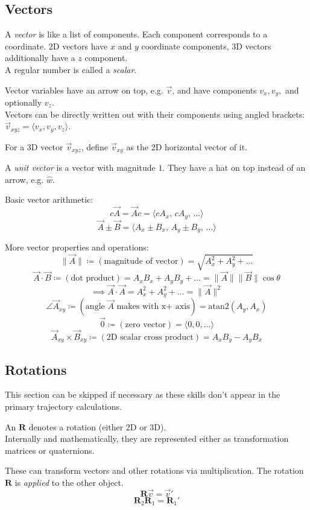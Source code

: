 \documentclass{article}
\begin{document}
\subsection*{Vectors}
A \textit{vector} is like a list of components. Each component corresponds to a coordinate. 2D vectors have $x$ and $y$ coordinate components, 3D vectors additionally have a $z$ component. \\
A regular number is called a \textit{scalar}.

Vector variables have an arrow on top, e.g. $\vec{v}$, and have components $v_x,v_y,$ and optionally $v_z$. \\
Vectors can be directly written out with their components using angled brackets: $\vec{v}_{xyz}=\langle v_x,v_y,v_z\rangle$.

For a 3D vector $\vec{v}_{xyz}$, define $\vec{v}_{xy}$ as the 2D horizontal vector of it.

A \textit{unit vector} is a vector with magnitude $1$. They have a hat on top instead of an arrow, e.g. $\hat{w}$.

Basic vector arithmetic:
\[ c\vec{A}=\vec{A}c=\langle cA_x,\,cA_y,\,\ldots\rangle \]
\[ \vec{A}\pm\vec{B}=\langle A_x\pm B_x,\,A_y\pm B_y,\,\ldots\rangle \]

More vector properties and operations:
\[ \lVert \vec{A} \rVert\coloneqq(\text{magnitude of vector})=\sqrt{A_x^2+A_y^2+\ldots} \]
\[ \vec{A}\cdot\vec{B}\coloneqq(\text{dot product})=A_xB_x+A_yB_y+\ldots=\lVert \vec{A} \rVert\lVert \vec{B} \rVert \cos\theta \]
\[ \implies \vec{A}\cdot\vec{A}=A_x^2+A_y^2+\ldots=\lVert \vec{A} \rVert^2 \]
\[ \angle\vec{A}_{xy}\coloneqq(\text{angle }\vec{A}\text{ makes with x+ axis})=\text{atan2}(A_y,A_x) \]
\[ \vec{0}\coloneqq(\text{zero vector})=\langle0,0,\ldots\rangle \]
\[ \vec{A}_{xy}\times\vec{B}_{xy}\coloneqq(\text{2D scalar cross product})=A_xB_y-A_yB_x \]

\subsection*{Rotations}
This section can be skipped if necessary as these skills don't appear in the primary trajectory calculations.

An $\boldsymbol{R}$ denotes a rotation (either 2D or 3D). \\
Internally and mathematically, they are represented either as transformation matrices or quaternions.

These can transform vectors and other rotations via multiplication. The rotation $\boldsymbol{R}$ is \textit{applied} to the other object.
\[ \boldsymbol{R}\vec{v}=\vec{v}' \]
\[ \boldsymbol{R}_2\boldsymbol{R}_1=\boldsymbol{R}_1' \]
\end{document}
